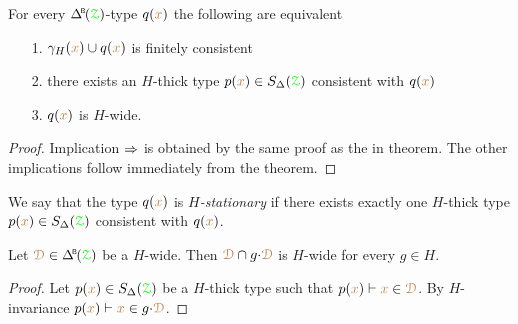 \begin{corollary}
  For every $\BDelta(\grZ)$-type $q({\color{brown} x})$ the following are equivalent 
  \begin{itemize}
    \item[1.] $\gamma_H({\color{brown} x})\cup q({\color{brown} x})$ is finitely consistent
    \item[2.] there exists an $H$-thick type $p({\color{brown} x})\in S_\Delta({\color{green}\EuScript Z})$ consistent with $q({\color{brown} x})$
    \item[3.] $q({\color{brown} x})$ is $H$-wide.\smallskip
  \end{itemize}
\end{corollary}

\begin{proof}
  Implication $\Rightarrow$ is obtained by the same proof as the in theorem.
  The other implications follow immediately from the theorem.
\end{proof}

We say that the type $q({\color{brown} x})$ is \emph{$H$-stationary\/} if there exists exactly one $H$-thick type $p({\color{brown} x})\in S_\Delta({\color{green}\EuScript Z})$ consistent with $q({\color{brown} x})$.

\begin{corollary}\label{corol_intersectionGwide}
  Let $\mrD\in\BDelta(\grZ)$ be a $H$-wide.
  Then ${\color{brown}\EuScript D}\cap g{\cdot}{\color{brown}\EuScript D}$ is $H$-wide for every $g\in H$.
\end{corollary}

\begin{proof}
  Let $p({\color{brown} x})\in S_\Delta({\color{green}\EuScript Z})$ be a $H$-thick type such that $p({\color{brown} x})\vdash{\color{brown}x}\in{\color{brown}\EuScript D}$.
  By $H$-invariance $p({\color{brown} x})\vdash{\color{brown}x}\in g{\cdot}{\color{brown}\EuScript D}$.
\end{proof}



